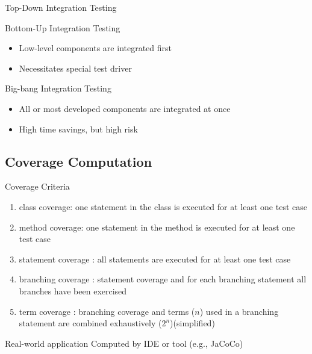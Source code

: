 \begin{frame}{\insertsubsection}
\begin{fancycolumns}[animation=none]
\begin{definition}{Top-Down Integration Testing}
\begin{itemize}
			\end{itemize}
		\end{definition} \pause
		\begin{definition}{Bottom-Up Integration Testing}
			\begin{itemize}
				\item Low-level components are integrated first
				\item Necessitates special test driver
			\end{itemize}
		\end{definition} 
		\begin{definition}{Big-bang Integration Testing}
			\begin{itemize}
				\item All or most developed components are integrated at once
				\item High time savings, but high risk
			\end{itemize}
		\end{definition} 
	\end{fancycolumns}
\end{frame}

\subsection{Coverage Computation}
\begin{frame}{\insertsubsection}
	\begin{fancycolumns}[animation=none]
		\begin{definition}{Coverage Criteria \mysource{\ludewiglichter}} %
			\begin{enumerate}
				\item class coverage: one statement in the class is executed for at least one test case
				\item method coverage: one statement in the method is executed for at least one test case
				\item statement coverage : all statements are executed for at least one test case
				\item branching coverage : statement coverage and for each branching statement all branches have been exercised
				\item term coverage : branching coverage and terms ($n$) used in a branching statement are combined exhaustively ($2^n$)\hfill(simplified)
			\end{enumerate}
		\end{definition} \pause
		\nextcolumn
		\begin{note}{Real-world application}%
			Computed by IDE or tool (e.g., JaCoCo)
		\end{note}
	\end{fancycolumns}
\end{frame}


